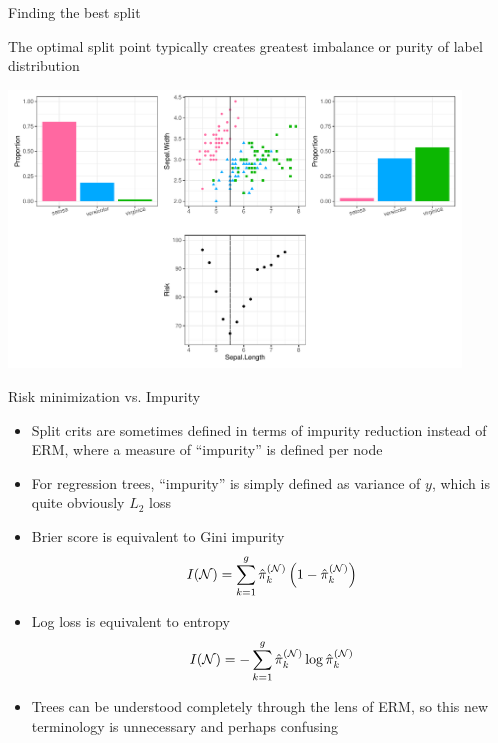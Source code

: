 \documentclass[11pt,compress,t,notes=noshow, xcolor=table]{beamer}
\begin{document}
\begin{frame}[b,noframenumbering]{Finding the best split}

The optimal split point typically creates greatest imbalance or purity of label distribution



\vspace{0.5cm}

  \includegraphics[width = 0.9\textwidth]{figure/splitcrit-classif_optimal-constant-grid.pdf}
\end{frame}

\begin{vbframe}{Risk minimization vs. Impurity}

\begin{itemize}
\item Split crits are sometimes defined in terms of impurity reduction instead of ERM, where a measure of ``impurity'' is defined per node
\item For regression trees, \enquote{impurity} is simply defined as variance of $y$, which is quite obviously $L_2$ loss

\item Brier score is equivalent to Gini impurity
$$I(\mathcal{N}) = \sum\limits_{k=1}^g \hat\pi_k^{(\mathcal{N})} \left( 1-\hat\pi_k^{(\mathcal{N})} \right)$$
\item Log loss is equivalent to entropy
$$I(\mathcal{N}) = -\sum\limits_{k=1}^g \hat\pi_k^{(\mathcal{N})} \log \hat\pi_k^{(\mathcal{N})}$$
\item Trees can be understood completely through the lens of ERM, so this new terminology is unnecessary and perhaps confusing
\end{itemize}
\end{vbframe}
\end{document}
